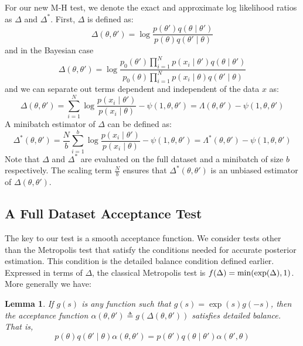 \documentclass{article}
\newtheorem{lemma}{Lemma}
\begin{document}
For our new M-H test, we denote the exact and approximate log likelihood ratios as $\Delta$ and $\Delta^*$.
First, $\Delta$ is defined as:
\begin{equation}\label{eq:delta0}
  \Delta(\theta,\theta') = \log\frac{p(\theta')q(\theta\mid\theta')}{p(\theta)q(\theta'\mid\theta)}
\end{equation}
and in the Bayesian case
\begin{equation}\label{eq:delta1}
\Delta(\theta,\theta')  =
\log \frac{p_0(\theta')\prod_{i=1}^N p(x_i \mid \theta')q(\theta \mid
  \theta')}{p_0(\theta)\prod_{i=1}^N p(x_i \mid \theta)q(\theta' \mid\theta)}
  \end{equation}
and we can separate out terms dependent and independent of the data $x$ as:
\begin{equation}\label{eq:delta2}
  \Delta(\theta,\theta') = \sum_{i=1}^N\log\frac{p(x_i\mid\theta')}{p(x_i\mid\theta)} - \psi(1,\theta,\theta') =
  \Lambda(\theta,\theta') -  \psi(1,\theta,\theta')
\end{equation}
A minibatch estimator of $\Delta$ can be defined as:
\begin{equation}\label{eq:delta3}
    \Delta^*(\theta,\theta') =
\frac{N}{b}\sum_{i=1}^b\log\frac{p(x_i\mid\theta')}{p(x_i\mid\theta)} - \psi(1,\theta,\theta') =
\Lambda^*(\theta,\theta') -     \psi(1,\theta,\theta')
\end{equation}
Note that $\Delta$ and $\Delta^*$ are evaluated on the full dataset and a minibatch of size $b$
respectively. The scaling term $\frac{N}{b}$ ensures that $\Delta^*(\theta,\theta')$ is an
unbiased estimator of $\Delta(\theta,\theta')$.

\subsection{A Full Dataset Acceptance Test}\label{ssec:deltas_full}

The key to our test is a smooth acceptance function.  We consider tests other than the Metropolis
test that satisfy the conditions needed for accurate posterior estimation. This condition is
the detailed balance condition defined earlier. Expressed in terms of $\Delta$, the
classical Metropolis test is $f(\Delta) = {\rm min}(\exp(\Delta),1)$. More generally we have:

\begin{lemma}\label{lem:detailed_balance}
  If $g(s)$ is any function such that $g(s) = \exp(s) g(-s)$, then the acceptance function $\alpha(\theta,\theta') \triangleq  g(\Delta(\theta,\theta'))$ satisfies detailed balance. That is,
  \begin{equation}\label{detbal}
    p(\theta)q(\theta'\mid\theta)\alpha(\theta,\theta') = p(\theta')q(\theta\mid\theta')\alpha(\theta',\theta)
    \end{equation}

\end{lemma}
\end{document}
